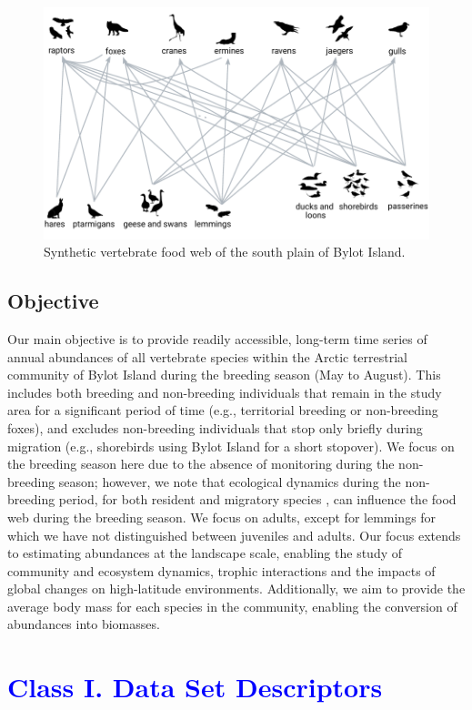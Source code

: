 \documentclass[a4paper,twoside,12pt]{article}
\begin{document}
\begin{figure}[H]
\centering
\includegraphics[width=0.75\linewidth]{figures/food_web.pdf} 
\caption{Synthetic vertebrate food web of the south plain of Bylot Island.}
\label{figure:food_web}
\end{figure}

\subsection*{Objective}
Our main objective is to provide readily accessible, long-term time series of annual abundances of all vertebrate species within the Arctic terrestrial community of Bylot Island during the breeding season (May to August). This includes both breeding and non-breeding individuals that remain in the study area for a significant period of time (e.g., territorial breeding or non-breeding foxes), and excludes non-breeding individuals that stop only briefly during migration (e.g., shorebirds using Bylot Island for a short stopover). We focus on the breeding season here due to the absence of monitoring during the non-breeding season; however, we note that ecological dynamics during the non-breeding period, for both resident \citep{hutchison2020} and migratory species \citep{moisan2023}, can influence the food web during the breeding season. We focus on adults, except for lemmings for which we have not distinguished between juveniles and adults. Our focus extends to estimating abundances at the landscape scale, enabling the study of community and ecosystem dynamics, trophic interactions and the impacts of global changes on high-latitude environments. Additionally, we aim to provide the average body mass for each species in the community, enabling the conversion of abundances into biomasses.
\newpage
\section*{\textcolor{Blue}{Class I. Data Set Descriptors}}
\end{document}
